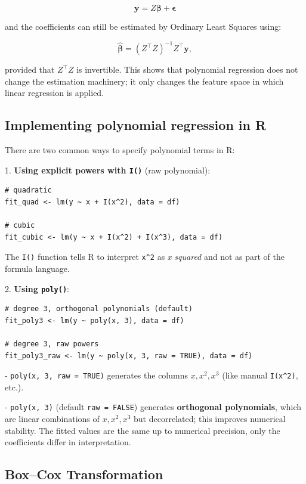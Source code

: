 \[
\mathbf{y} = Z \boldsymbol{\beta} + \boldsymbol{\epsilon}
\]

and the coefficients can still be estimated by Ordinary Least Squares using:

\[
\hat{\boldsymbol{\beta}} = (Z^\top Z)^{-1} Z^\top \mathbf{y},
\]

provided that $Z^\top Z$ is invertible. This shows that polynomial regression does not change the estimation machinery; it only changes the feature space in which linear regression is applied.

\subsection{Implementing polynomial regression in R}

There are two common ways to specify polynomial terms in R:

1. \textbf{Using explicit powers with \texttt{I()}} (raw polynomial):

\begin{verbatim}
# quadratic
fit_quad <- lm(y ~ x + I(x^2), data = df)

# cubic
fit_cubic <- lm(y ~ x + I(x^2) + I(x^3), data = df)
\end{verbatim}

The \texttt{I()} function tells R to interpret \texttt{x\^{}2} as \emph{x squared} and not as part of the formula language.


2. \textbf{Using \texttt{poly()}}:

\begin{verbatim}
# degree 3, orthogonal polynomials (default)
fit_poly3 <- lm(y ~ poly(x, 3), data = df)

# degree 3, raw powers
fit_poly3_raw <- lm(y ~ poly(x, 3, raw = TRUE), data = df)
\end{verbatim}

- \texttt{poly(x, 3, raw = TRUE)} generates the columns $x, x^2, x^3$ (like manual \texttt{I(x\^{}2)}, etc.).

- \texttt{poly(x, 3)} (default \texttt{raw = FALSE}) generates \textbf{orthogonal polynomials}, which are linear combinations of $x, x^2, x^3$ but decorrelated; this improves numerical stability. The fitted values are the same up to numerical precision, only the coefficients differ in interpretation.



\subsection{Box–Cox Transformation}

